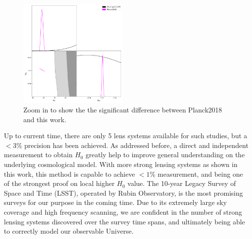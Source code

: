 \documentclass{cosmo}
\begin{document}
    \begin{figure}[h]
        \centering
        \includegraphics[width=0.48\textwidth]{H0LiCOW-Planck-allN-zoom.png}
        \caption{Zoom in to show the the significant difference
        between Planck2018 and this work.}
        \label{fig9}
    \end{figure}
    
    Up to current time, there are only 5 lens systems available for such studies, but a $<3 \%$ precision has been achieved. As addressed before, a direct and independent measurement to obtain $H_\mathrm{0}$ greatly help to improve general understanding on the underlying cosmological model. With more strong lensing systems as shown in this work, this method is capable to achieve \emph{$<1\%$} measurement, and being one of the strongest proof on local higher $H_\mathrm{0}$ value. The 10-year Legacy Survey of Space and Time (LSST), operated by Rubin Observatory, is the most promising surveys for our purpose in the coming time. Due to its extremely large sky coverage and high frequency scanning, we are confident in the number of strong lensing systems discovered over the survey time spans, and ultimately being able to correctly model our observable Universe.
    
\end{document}
